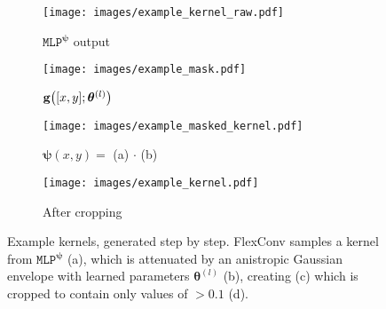 \documentclass{article} \usepackage{iclr2022_conference,times}
\renewcommand{\vec}[1]{\ensuremath{\mathbf{\MakeLowercase{{#1}}}}}
\newcommand{\gv}{\vec{g}}
\begin{document}
\begin{figure}
    \centering
     \begin{subfigure}[c]{0.24\textwidth}
\centering
         \texttt{[image: images/example\_kernel\_raw.pdf]}
         \caption{$\texttt{MLP}^{\boldsymbol{\psi}}$ output}
\label{fig:flexconvexample-raw}
     \end{subfigure}
\begin{subfigure}[c]{0.24\textwidth}
\centering
         \texttt{[image: images/example\_mask.pdf]}
\caption{$\gv\big( [x,y] ; \boldsymbol{\theta}^{(l)}\big)$ }
         \label{fig:flexconvexample-mask}
     \end{subfigure}
     \begin{subfigure}[c]{0.24\textwidth}
\centering
         \texttt{[image: images/example\_masked\_kernel.pdf]}
\caption{
         $\boldsymbol{\psi}(x, y) = $ (a) $\cdot$ (b)}
         \label{fig:flexconvexample-maskedkernel}
     \end{subfigure}
     \begin{subfigure}[c]{0.24\textwidth}
\centering
         \texttt{[image: images/example\_kernel.pdf]}
\caption{After cropping}
         \label{fig:flexconvexample-kernel}
     \end{subfigure}
    \caption{Example kernels, generated step by step. FlexConv samples a kernel from  $\texttt{MLP}^{\boldsymbol{\psi}}$ (a), which is attenuated by an anistropic Gaussian envelope with learned parameters $\boldsymbol{\theta}^{(l)}$ (b), creating (c) which is cropped to contain only values of $> 0.1$ (d).
    \vspace{-2mm}}
    \label{fig:app-flexconvexample}
\end{figure}
\end{document}
